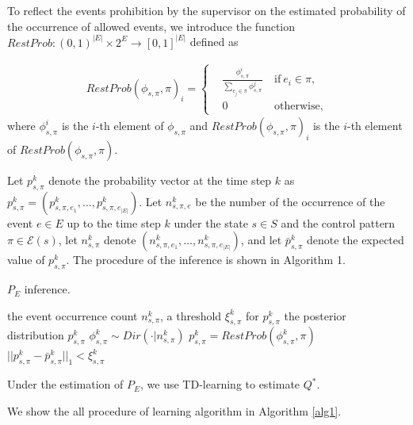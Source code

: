 \documentclass[letterpaper, 10 pt, conference]{ieeeconf}
\begin{document}
To reflect the events prohibition by the supervisor on the estimated probability of the occurrence of allowed events, we introduce the function $RestProb : (0,1)^{|E|} \times 2^E \rightarrow [0,1]^{|E|}$ defined as

\begin{align}
  RestProb(\phi_{s,\pi},\pi)_i =
  \left\{
  \begin{aligned}
    & \frac{\phi^i_{s,\pi}}{\sum_{e_j \in \pi} \phi^j_{s,\pi}} \  &\text{if}\ e_i \in \pi,\\
    &0   \ &\text{otherwise},
  \end{aligned}
  \right.
\end{align}
where $\phi^i_{s,\pi}$ is the $i$-th element of $\phi_{s,\pi}$ and $RestProb(\phi_{s,\pi},\pi)_i$ is the $i$-th element of $RestProb(\phi_{s,\pi},\pi)$.

Let $p^k_{s,\pi}$ denote the probability vector at the time step $k$ as $p^k_{s,\pi} = (p^k_{s,\pi,e_1}, \ldots, p^k_{s,\pi,e_{|E|}})$. Let $n^k_{s,\pi,e}$ be the number of the occurrence of the event $e \in E$ up to the time step $k$ under the state $s \in S$ and the control pattern $\pi \in \mathcal{E}(s)$, let $n^k_{s,\pi}$ denote $(n^k_{s,\pi,e_1}, \ldots, n^k_{s,\pi,e_{|E|}})$, and let $\bar{p}^k_{s,\pi}$ denote the expected value of $p^k_{s,\pi}$. The procedure of the inference is shown in Algorithm 1.

\begin{algorithm}
 \caption{$P_E$ inference.}
 \begin{algorithmic}[1]
 \renewcommand{\algorithmicrequire}{\textbf{Input:}}
 \renewcommand{\algorithmicensure}{\textbf{Output:}}
 \REQUIRE the event occurrence count $n^k_{s,\pi}$, a threshold $\xi^k_{s,\pi}$ for $p^k_{s,\pi}$
 \ENSURE  the posterior distribution $p^k_{s,\pi}$
  \REPEAT
  \STATE $\phi^k_{s,\pi} \sim Dir(\cdot|n^k_{s,\pi})$
  \STATE $p^k_{s,\pi} = RestProb(\phi^k_{s,\pi},\pi)$
  \UNTIL $||p^k_{s,\pi} - \bar{p}^k_{s,\pi}||_1 < \xi^k_{s,\pi}$
 \end{algorithmic}
 \label{bayes}
 \end{algorithm}

Under the estimation of $P_E$, we use TD-learning to estimate $Q^{\ast}$.

We show the all procedure of learning algorithm in Algorithm \ref{alg1}.
\end{document}
